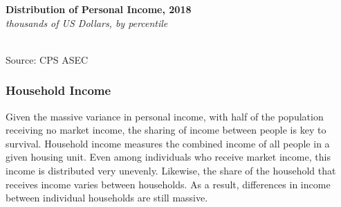 \documentclass{report}
\newcommand{\tbllink}[1]{\href{https://raw.githubusercontent.com/bdecon/US-chartbook/master/chartbook/data/#1}{\faTable}}
\begin{document}
{{{\begin{minipage}{0.76\textwidth}
\noindent \normalsize \textbf{Distribution of Personal Income, 2018}\\
\footnotesize{\textit{thousands of US Dollars, by percentile}}\\
\noindent {}\\
\footnotesize{Source: CPS ASEC} \hspace{39mm} \tbllink{pearn_dist.csv}
\end{minipage}

\newpage 

\subsubsection*{\color{black!70} \seriffont Household Income}

\begin{minipage}{0.76\textwidth} 
\small Given the massive variance in personal income, with half of the population receiving no market income, the sharing of income between people is key to survival. Household income measures the combined income of all people in a given housing unit. Even among individuals who receive market income, this income is distributed very unevenly. Likewise, the share of the household that receives income varies between households. As a result, differences in income between individual households are still massive. 

\end{minipage}

\vspace{1mm}

}}}
\end{document}
